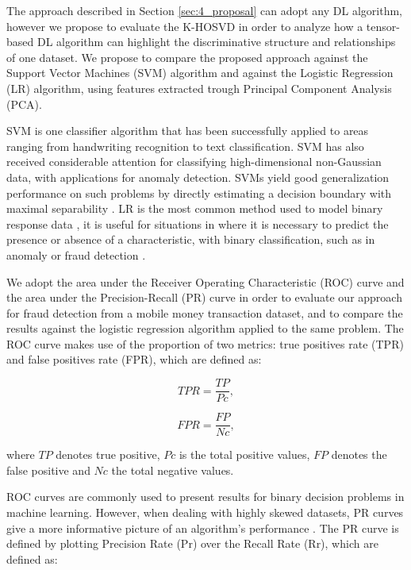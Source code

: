 The approach described in Section \ref{sec:4_proposal} can adopt any DL algorithm, however we propose to evaluate the K-HOSVD in order to analyze how a tensor-based DL algorithm can highlight the discriminative structure and relationships of one dataset. We propose to compare the proposed approach against the Support Vector Machines (SVM) algorithm and against the Logistic Regression (LR) algorithm, using features extracted trough Principal Component Analysis (PCA). 

SVM is one classifier algorithm that has been successfully applied to areas ranging from handwriting recognition to text classification. SVM has also received considerable attention for classifying high-dimensional non-Gaussian data, with applications for anomaly detection. SVMs yield good generalization performance on such problems by directly estimating a decision boundary with maximal separability \cite{akbani2004applying, banerjee2006support}. LR is the most common method used to model binary response data \cite{hilbe2011logistic}, it is useful for situations in where it is necessary to predict the presence or absence of a characteristic, with binary classification, such as in anomaly or fraud detection \cite{bhattacharyya2011data}.

We adopt the area under the Receiver Operating Characteristic (ROC) curve and the area under the Precision-Recall (PR) curve in order to evaluate our approach for fraud detection from a mobile money transaction dataset, and to compare the results against the logistic regression algorithm applied to the same problem. The ROC curve makes use of the proportion of two metrics: true positives rate (TPR) and false positives rate (FPR), which are defined as:

\begin{equation}\label{eq:4_eq04}
	TPR = \frac{TP}{Pc},
\end{equation}

\begin{equation}\label{eq:4_eq05}
	FPR = \frac{FP}{Nc},
\end{equation}

where $TP$ denotes true positive, $Pc$ is the total positive values, $FP$ denotes the false positive and $Nc$ the total negative values.

ROC curves are commonly used to present results for binary decision problems in machine learning. However, when dealing with highly skewed datasets, PR curves give a more informative picture of an algorithm’s performance \cite{davis2006relationship, he2009learning}. The PR curve is defined by plotting Precision Rate (Pr) over the Recall Rate (Rr), which are defined as:

